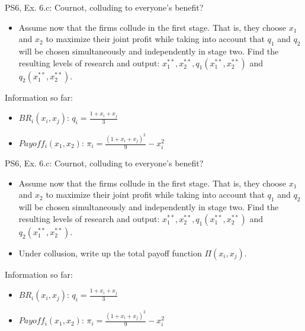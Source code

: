 \begin{frame}{PS6, Ex. 6.c: Cournot, colluding to everyone's benefit?}
    \begin{itemize}
    \item[(c)] Assume now that the firms collude in the first stage. That is, they choose $x_1$ and $x_2$ to maximize their joint profit while taking into account that $q_1$ and $q_2$ will be chosen simultaneously and independently in stage two. Find the resulting levels of research and output: $x_1^{**},x_2^{**},q_1(x_1^{**},x_2^{**})$ and $q_2(x_1^{**},x_2^{**})$.
    \end{itemize}
  \begin{multicols}{2}
    \vfill\null \columnbreak
    Information so far:
    \begin{itemize}
      \item[1] $BR_i(x_i,x_j)$: $q_i = \frac{1+x_i+x_j}{3}$
      \item[2] $Payoff_i(x_1,x_2)$: $\pi_i=\frac{(1+x_i+x_j)^2}{9}-x_i^2$
    \end{itemize}
    \vfill\null
  \end{multicols}
\end{frame}
\begin{frame}{PS6, Ex. 6.c: Cournot, colluding to everyone's benefit?}
    \begin{itemize}
    \item[(c)] Assume now that the firms collude in the first stage. That is, they choose $x_1$ and $x_2$ to maximize their joint profit while taking into account that $q_1$ and $q_2$ will be chosen simultaneously and independently in stage two. Find the resulting levels of research and output: $x_1^{**},x_2^{**},q_1(x_1^{**},x_2^{**})$ and $q_2(x_1^{**},x_2^{**})$.
    \end{itemize}
  \begin{multicols}{2}
    \begin{itemize}
      \item[(Step a)] Under collusion, write up the total payoff function $\Pi(x_i,x_j)$.
    \end{itemize}
    \vfill\null \columnbreak
    Information so far:
    \begin{itemize}
      \item[1] $BR_i(x_i,x_j)$: $q_i = \frac{1+x_i+x_j}{3}$
      \item[2] $Payoff_i(x_1,x_2)$: $\pi_i=\frac{(1+x_i+x_j)^2}{9}-x_i^2$
    \end{itemize}
    \vfill\null
  \end{multicols}
\end{frame}
